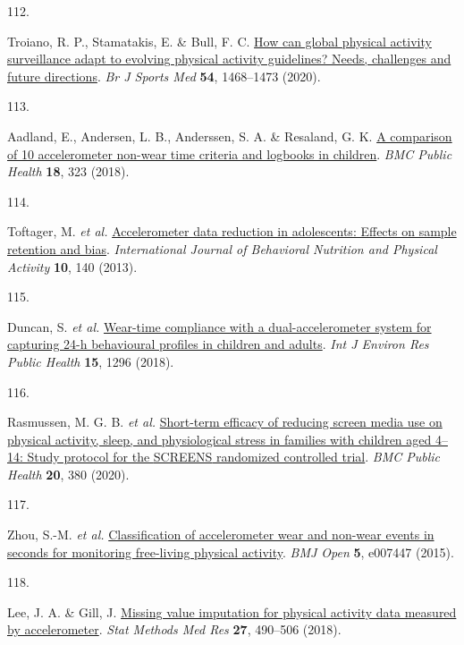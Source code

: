 \documentclass[
  10pt,
]{scrbook}
\newlength{\cslhangindent}
\newlength{\csllabelwidth}
\newlength{\cslentryspacingunit} %
\newenvironment{CSLReferences}[2] %
 {%
  \setlength{\parindent}{0pt}
  \ifodd #1
  \let\oldpar\par
  \def\par{\hangindent=\cslhangindent\oldpar}
  \fi
  \setlength{\parskip}{#2\cslentryspacingunit}
 }%
 {}
\newcommand{\CSLLeftMargin}[1]{\parbox[t]{\csllabelwidth}{#1}}
\newcommand{\CSLRightInline}[1]{\parbox[t]{\linewidth - \csllabelwidth}{#1}\break}
\let\originaltextbf\textbf
\renewcommand{\textbf}[1]{\textcolor{color1}{\textsf{\originaltextbf{#1}}}}
\begin{document}
\begin{CSLReferences}{0}{0}
\leavevmode{}%
\CSLLeftMargin{112. }%
\CSLRightInline{Troiano, R. P., Stamatakis, E. \& Bull, F. C.
\href{https://doi.org/10.1136/bjsports-2020-102621}{How can global
physical activity surveillance adapt to evolving physical activity
guidelines? Needs, challenges and future directions}. \emph{Br J Sports
Med} \textbf{54}, 1468--1473 (2020).}

\leavevmode{}%
\CSLLeftMargin{113. }%
\CSLRightInline{Aadland, E., Andersen, L. B., Anderssen, S. A. \&
Resaland, G. K. \href{https://doi.org/10.1186/s12889-018-5212-4}{A
comparison of 10 accelerometer non-wear time criteria and logbooks in
children}. \emph{{BMC} Public Health} \textbf{18}, 323 (2018).}

\leavevmode{}%
\CSLLeftMargin{114. }%
\CSLRightInline{Toftager, M. \emph{et al.}
\href{https://doi.org/10.1186/1479-5868-10-140}{Accelerometer data
reduction in adolescents: Effects on sample retention and bias}.
\emph{International Journal of Behavioral Nutrition and Physical
Activity} \textbf{10}, 140 (2013).}

\leavevmode{}%
\CSLLeftMargin{115. }%
\CSLRightInline{Duncan, S. \emph{et al.}
\href{https://doi.org/10.3390/ijerph15071296}{Wear-time compliance with
a dual-accelerometer system for capturing 24-h behavioural profiles in
children and adults}. \emph{Int J Environ Res Public Health}
\textbf{15}, 1296 (2018).}

\leavevmode{}%
\CSLLeftMargin{116. }%
\CSLRightInline{Rasmussen, M. G. B. \emph{et al.}
\href{https://doi.org/10.1186/s12889-020-8458-6}{Short-term efficacy of
reducing screen media use on physical activity, sleep, and physiological
stress in families with children aged 4--14: Study protocol for the
{SCREENS} randomized controlled trial}. \emph{{BMC} Public Health}
\textbf{20}, 380 (2020).}

\leavevmode{}%
\CSLLeftMargin{117. }%
\CSLRightInline{Zhou, S.-M. \emph{et al.}
\href{https://doi.org/10.1136/bmjopen-2014-007447}{Classification of
accelerometer wear and non-wear events in seconds for monitoring
free-living physical activity}. \emph{{BMJ} Open} \textbf{5}, e007447
(2015).}

\leavevmode{}%
\CSLLeftMargin{118. }%
\CSLRightInline{Lee, J. A. \& Gill, J.
\href{https://doi.org/10.1177/0962280216633248}{Missing value imputation
for physical activity data measured by accelerometer}. \emph{Stat
Methods Med Res} \textbf{27}, 490--506 (2018).}


\end{CSLReferences}
\end{document}
